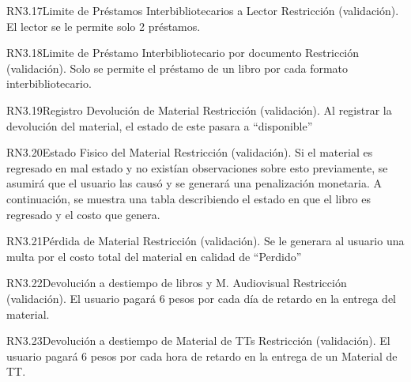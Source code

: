 \begin{BussinesRule}{RN3.17}{Limite de Préstamos Interbibliotecarios a Lector } 
	\BRitem[Tipo:] Restricción (validación).
	\BRitem[Descripción:]El lector se le permite solo 2 préstamos.
\end{BussinesRule}

\begin{BussinesRule}{RN3.18}{Limite de Préstamo Interbibliotecario por documento} 
	\BRitem[Tipo:] Restricción (validación).
	\BRitem[Descripción:]Solo se permite el préstamo de un libro por cada formato interbibliotecario.
\end{BussinesRule}

\begin{BussinesRule}{RN3.19}{Registro Devolución de Material } 
	\BRitem[Tipo:] Restricción (validación).
	\BRitem[Descripción:]Al registrar la devolución del material, el estado de este pasara a “disponible”
\end{BussinesRule}

\begin{BussinesRule}{RN3.20}{Estado Fisico del Material} 
	\BRitem[Tipo:] Restricción (validación).
	\BRitem[Descripción:]Si el material es regresado en mal estado y no existían observaciones sobre esto previamente, se asumirá que el usuario las causó y se generará una penalización monetaria. A continuación, se muestra una tabla describiendo el estado en que el libro es regresado y el costo que genera.
\end{BussinesRule}

\begin{BussinesRule}{RN3.21}{Pérdida de Material} 
	\BRitem[Tipo:] Restricción (validación).
	\BRitem[Descripción:]Se le generara al usuario una multa por el costo total del material en calidad de “Perdido”
\end{BussinesRule}

\begin{BussinesRule}{RN3.22}{Devolución a destiempo de libros y M. Audiovisual} 
	\BRitem[Tipo:] Restricción (validación).
	\BRitem[Descripción:]El usuario pagará 6 pesos por cada día de retardo en la entrega del material.
\end{BussinesRule}

\begin{BussinesRule}{RN3.23}{Devolución a destiempo de Material de TTs} 
	\BRitem[Tipo:] Restricción (validación).
	\BRitem[Descripción:]El usuario pagará 6 pesos por cada hora de retardo en la entrega de un Material de TT. 
\end{BussinesRule}

